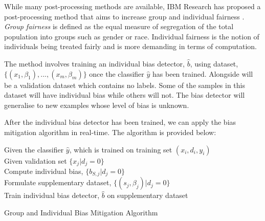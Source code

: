 While many post-processing methods are available, IBM Research has proposed a post-processing method that aims to increase group and individual fairness \cite{lohia2018bias}.
\textit{Group fairness} is defined as the equal measure of segregation of the total population into groups such as gender or race. 
Individual fairness is the notion of individuals being treated fairly and is more demanding in terms of computation.

The method involves training an individual bias detector, $\hat{b}$, using dataset, \\ 
$\{(x_1,\beta_1), ..., (x_m,\beta_m)\}$ once the classifier $\hat{y}$ has been trained.
Alongside will be a validation dataset which contains no labels.
Some of the samples in this dataset will have individual bias while others will not.
The bias detector will generalise to new examples whose level of bias is unknown.

After the individual bias detector has been trained, we can apply the bias mitigation algorithm \cite{lohia2018bias} in real-time. 
The algorithm is provided below:  


\begin{algorithm}[H]
    \SetAlgoLined
    Given the classifier $\hat{y}$, which is trained on training set ${(x_i, d_i, y_i)}$ \\
    Given validation set $\{x_j | d_j = 0\}$\\
    Compute individual bias, $\{b_{S,j}|d_j=0\}$\\
    Formulate supplementary dataset, $\{(s_j,\beta_j)|d_j = 0 \}$\\
    Train individual bias detector, $\hat{b}$ on supplementary dataset\\
    \caption{Group and Individual Bias Mitigation Algorithm \cite{lohia2018bias}}
\end{algorithm}
